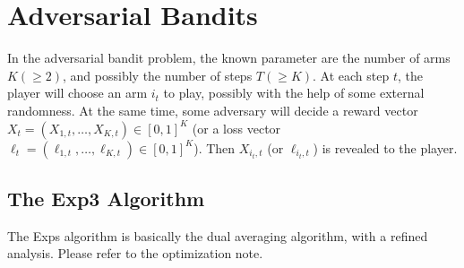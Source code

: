 \documentclass[openany]{book}
\newtheorem{theorem}{Theorem}[chapter]
\theoremstyle{definition}
\theoremstyle{remark}
\begin{document}
\begin{comment}
\section{Thompson Sampling}
The Thompson sampling method is a Bayesian method. Suppose for each arm $1\le i\le K$, $\nu_i$ is a Bernoulli distribution with mean $\mu_i$. We give a uniform prior to every $\mu_i$, and let $\nu_{i,t}$ denote the posterior distribution of $\mu_i$ after $t$ steps and $\theta_{i,t}$ denote a sample from $\nu_{i,t}$. The Thompson sampling method just chooses
\begin{equation}
    i_t\in\arg\max_{1\le i\le K}\theta_{i,t}.
\end{equation}

The Thompson sampling method is also asympototically optimal:
\begin{theorem}[\cite{KKM12} Theorem 1]
    For every $\epsilon>0$, there exists a constant $C(\epsilon,\mu_1,\ldots,\mu_K)$ such that the regret of Thompson sampling satisfies
    \begin{equation}\label{ThompsonBound}
        \overline{\mathrm{Regret}(T)}\le(1+\epsilon)\sum_{i|\Delta_i>0}^{}\frac{\Delta_i}{D_{\mathrm{KL}}(\nu_i\Vert\nu^*)}(\ln T+\ln\ln T)+C(\epsilon,\mu_1,\ldots,\mu_K).
    \end{equation}
\end{theorem}

Also, in \cite{KKM12} it is claimed that the empirical performance of Thompson sampling is better than KL-UCB, and much better than UCB.
\end{comment}

\chapter{Adversarial Bandits}
In the adversarial bandit problem, the known parameter are the number of arms $K(\ge2)$, and possibly the number of steps $T(\ge K)$. At each step $t$, the player will choose an arm $i_t$ to play, possibly with the help of some external randomness. At the same time, some adversary will decide a reward vector $X_t=(X_{1,t},\ldots,X_{K,t})\in[0,1]^K$ (or a loss vector $\ell_t=(\ell_{1,t},\ldots,\ell_{K,t})\in[0,1]^K$). Then $X_{i_t,t}$ (or $\ell_{i_t,t}$) is revealed to the player.

\section{The Exp3 Algorithm}
The Exps algorithm is basically the dual averaging algorithm, with a refined analysis. Please refer to the optimization note.



\end{document}
